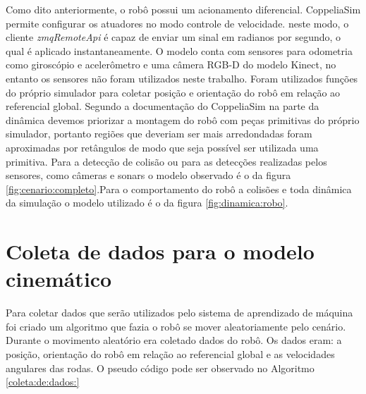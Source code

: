 Como dito anteriormente, o robô possui um acionamento diferencial.
CoppeliaSim permite configurar os atuadores no modo controle de
velocidade. neste modo, o cliente \textit{zmqRemoteApi} é capaz de enviar
um sinal em radianos por segundo, o qual é aplicado instantaneamente.
O modelo conta com sensores para odometria como giroscópio e acelerômetro
e uma câmera RGB-D do modelo Kinect, no entanto os sensores não foram
utilizados neste trabalho.
Foram utilizados funções do próprio simulador para coletar posição e 
orientação do robô em relação ao referencial global.
Segundo a documentação do CoppeliaSim na parte da dinâmica
devemos priorizar a montagem do robô com peças primitivas do próprio
simulador, portanto regiões que deveriam ser mais arredondadas foram
aproximadas por retângulos de modo que seja possível ser utilizada uma
primitiva. Para a detecção de colisão ou para as detecções realizadas
pelos sensores,
como câmeras e sonars o modelo
observado é o da figura \ref{fig:cenario:completo}.Para o comportamento 
do robô a colisões e toda dinâmica da simulação o modelo utilizado
é o da figura \ref{fig:dinamica:robo}.


\section{Coleta de dados para o modelo cinemático}
Para coletar dados que serão utilizados pelo sistema de aprendizado de máquina
foi criado um algoritmo que fazia o robô se mover aleatoriamente pelo cenário.
Durante o movimento aleatório era coletado dados do robô.
Os dados eram: a posição, orientação do robô em relação ao referencial global e
as velocidades angulares das rodas. O pseudo código pode ser observado no Algoritmo \ref{coleta:de:dados:}

